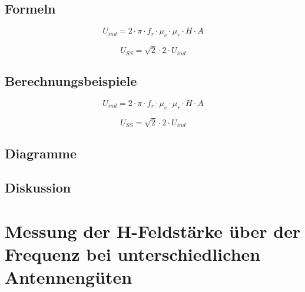 \documentclass[12pt,a4paper,ngerman]{article}
\begin{document}
\subsection{Formeln}

\begin{equation}
U_{ind} = 2 \cdot  \pi \cdot f_r \cdot \mu_e \cdot \mu_r \cdot H \cdot A
\end{equation}

\begin{equation}
U_{SS} = \sqrt{2}  \cdot 2 \cdot U_{ind}
\end{equation}
\pagebreak
\subsection{Berechnungsbeispiele}

\begin{equation}
U_{ind} = 2 \cdot  \pi \cdot f_r \cdot \mu_e \cdot \mu_r \cdot H \cdot A
\end{equation}

\begin{equation}
U_{SS} = \sqrt{2}  \cdot 2 \cdot U_{ind}
\end{equation}

\subsection{Diagramme}


\subsection{Diskussion}


\pagebreak



\section{Messung der H-Feldstärke über der Frequenz bei unterschiedlichen Antennengüten}
\end{document}
